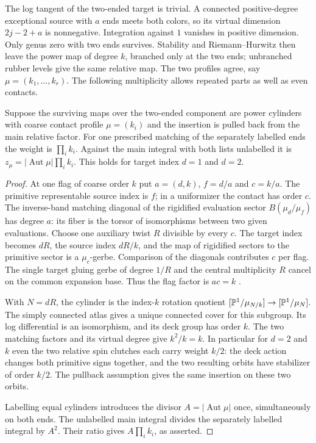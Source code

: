 The log tangent of the two-ended target is trivial. A connected
positive-degree exceptional source with \(a\) ends meets both colors,
so its virtual dimension \(2j-2+a\) is nonnegative. Integration against
\(1\) vanishes in positive dimension. Only genus zero with two ends
survives. Stability and Riemann--Hurwitz then leave the power map
of degree \(k\), branched only at the two ends; unbranched rubber
levels give the same relative map. The two profiles agree, say
\(\mu=(k_1,\ldots,k_r)\). The following multiplicity allows repeated
parts as well as even contacts.
\begin{lemma}\label{lem:twoends}
Suppose the surviving maps over the two-ended component are power
cylinders with coarse contact profile \(\mu=(k_i)\) and the insertion
is pulled back from the main relative factor. For one prescribed
matching of the separately labelled ends the weight is \(\prod_i k_i\).
Against the main integral with both lists unlabelled it is
\(z_\mu=|\operatorname{Aut}\mu|\prod_i k_i\). This holds for target
index \(d=1\) and \(d=2\).
\end{lemma}
\begin{proof}
At one flag of coarse order \(k\) put \(a=(d,k)\), \(f=d/a\)
and \(c=k/a\). The primitive representable source index is \(f\);
in a uniformizer the contact has order \(c\). The inverse-band
matching diagonal of the rigidified evaluation sector
\(B(\mu_d/\mu_f)\) has degree \(a\): its fiber is the torsor of
isomorphisms between two given evaluations. Choose one auxiliary
twist \(R\) divisible by every \(c\). The target index becomes
\(dR\), the source index \(dR/k\), and the map of rigidified
sectors to the primitive sector is a \(\mu_c\)-gerbe. Comparison
of the diagonals contributes \(c\) per flag. The single target
gluing gerbe of degree \(1/R\) and the central multiplicity \(R\)
cancel on the common expansion base. Thus the flag factor is
\(ac=k\) \cite[\S\S5.5--5.10, Lemma~5.15 and Proposition~5.18]{af}.

With \(N=dR\), the cylinder is the index-\(k\) rotation quotient
\([{\mathbb P}^1/\mu_{N/k}]\to[{\mathbb P}^1/\mu_N]\). The simply connected
atlas gives a unique connected cover for this subgroup. Its log
differential is an isomorphism, and its deck group has order \(k\).
The two matching factors and its virtual degree give \(k^2/k=k\).
In particular for \(d=2\) and \(k\) even the two relative spin
clutches each carry weight \(k/2\): the deck action changes both
primitive signs together, and the two resulting orbits have
stabilizer of order \(k/2\). The pullback assumption gives the
same insertion on these two orbits.

Labelling equal cylinders introduces the divisor
\(A=|\operatorname{Aut}\mu|\) once, simultaneously on both ends.
The unlabelled main integral divides the separately labelled integral
by \(A^2\). Their ratio gives \(A\prod_i k_i\), as asserted.
\end{proof}

